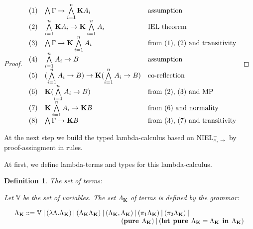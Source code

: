 \documentclass[a4paper]{article}
\newtheorem{defin}{Definition}
\begin{document}
\begin{proof}
$\begin{array}{lll}
(1) &\bigwedge \Gamma \rightarrow \bigwedge \limits_{i = 1}^{n} {\bf K} A_i & \text{assumption} \\
(2) &\bigwedge \limits_{i = 1}^{n} {\bf K} A_i \rightarrow {\bf K} \bigwedge \limits_{i = 1}^{n} A_i& \text{IEL theorem} \\
(3) &\bigwedge \Gamma \rightarrow {\bf K} \bigwedge \limits_{i = 1}^{n} A_i & \text{from (1), (2) and transitivity} \\
(4) &\bigwedge \limits_{i = 1}^{n} A_i \rightarrow B& \text{assumption} \\
(5) &(\bigwedge \limits_{i = 1}^{n} A_i \rightarrow B) \rightarrow {\bf K} (\bigwedge \limits_{i = 1}^{n} A_i \rightarrow B)& \text{co-reflection}\\
(6) &{\bf K} (\bigwedge \limits_{i = 1}^{n} A_i \rightarrow B)& \text{from (2), (3) and MP} \\
(7) &{\bf K} \bigwedge \limits_{i = 1}^{n} A_i \rightarrow {\bf K} B & \text{from (6) and normality} \\
(8) &\bigwedge \Gamma \rightarrow {\bf K} B & \text{from (3), (7) and transitivity}
\end{array}$

  \end{proof}

  \vspace{\baselineskip}

  At the next step we build the typed lambda-calculus based on NIEL$^{-}_{\land, \to}$ by proof-assingment in
  rules.

  At first, we define lambda-terms and types for this lambda-calculus.

  \vspace{\baselineskip}

  \begin{defin} The set of terms:

  Let $\mathbb{V}$ be the set of variables. The set $\Lambda_{\textbf{K}}$ of terms is defined by the grammar:

$\begin{array}{lll}
& \Lambda_{\textbf{K}} ::= \mathbb{V} \: | \:  (\lambda \Lambda.\Lambda_{\textbf{K}}) \: | \: (\Lambda_{\textbf{K}}\Lambda_{\textbf{K}}) \: | \: (\Lambda_{\textbf{K}} , \Lambda_{\textbf{K}}) \: | \: (\pi_1 \Lambda_{\textbf{K}}) \: | \: (\pi_2 \Lambda_{\textbf{K}}) \: | & \\
& \quad\quad\quad\quad\quad\quad\quad\quad\quad\quad\quad\quad\quad\quad\quad\quad ({\bf pure \: } \: \Lambda_{\textbf{K}}) \: | \: ({\bf let \:\: pure} \:\: \Lambda_{\textbf{K}} = \Lambda_{\textbf{K}} \:\: {\bf in} \:\: \Lambda_{\textbf{K}})
\end{array}$

  \end{defin}
\end{document}
